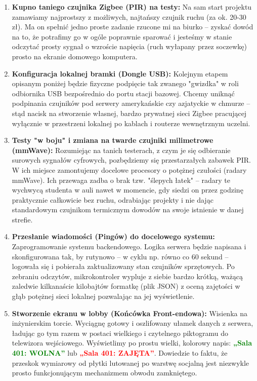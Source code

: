\documentclass[12pt,a4paper]{article}
\begin{document}
\begin{enumerate}
    \item \textbf{Kupno taniego czujnika Zigbee (PIR) na testy:} Na sam start projektu zamawiamy najprostszy z możliwych, najtańszy czujnik ruchu (za ok. 20-30 zł). Ma on spełnić jedno proste zadanie rzucone mi na biurko -- zyskać dowód na to, że potrafimy go w ogóle poprawnie sparować i jesteśmy w stanie odczytać prosty sygnał o wzroście napięcia (ruch wyłapany przez soczewkę) prosto na ekranie domowego komputera.
    
    \item \textbf{Konfiguracja lokalnej bramki (Dongle USB):} Kolejnym etapem opisanym poniżej będzie fizyczne podpięcie tak zwanego "gwizdka" w roli odbiornika USB bezpośrednio do portu stacji bazowej. Chcemy uniknąć podpinania czujników pod serwery amerykańskie czy azjatyckie w chmurze – stąd nacisk na stworzenie własnej, bardzo prywatnej sieci Zigbee pracującej wyłącznie w przestrzeni lokalnej po kablach i routerze wewnętrznym uczelni.
    
    \item \textbf{Testy "w boju" i zmiana na twarde czujniki milimetrowe (mmWave):} Rozumiejąc na tanich testerach, z czym je się odbieranie surowych sygnałów cyfrowych, pozbędziemy się przestarzałych zabawek PIR. W ich miejsce zamontujemy docelowe procesory o potężnej czułości (radary mmWave). Ich przewaga zadba o brak tzw. "ślepych łatek" -- radary te wychwycą studenta w auli nawet w momencie, gdy siedzi on przez godzinę praktycznie całkowicie bez ruchu, odrabiając projekty i nie dając standardowym czujnikom termicznym dowodów na swoje istnienie w danej strefie.
    
    \item \textbf{Przesłanie wiadomości (Pingów) do docelowego systemu:} Zaprogramowanie systemu backendowego. Logika serwera będzie napisana i skonfigurowana tak, by rutynowo -- w cyklu np. równo co 60 sekund -- logowała się i pobierała zaktualizowany stan czujników sprzętowych. Po zebraniu odczytów, mikrokontroler wypluje z siebie bardzo krótką, ważącą zaledwie kilkanaście kilobajtów formatkę (plik JSON) z oceną zajętości w głąb potężnej sieci lokalnej pozwalając na jej wyświetlenie.
    
    \item \textbf{Stworzenie ekranu w lobby (Końcówka Front-endowa):} Wisienka na inżynierskim torcie. Wyciągnę gotowy i oszlifowany ułamek danych z serwera, ładując go tym razem w postaci wielkiego i czytelnego piktogramu do telewizora wejściowego. Wyświetlimy po prostu wielki, kolorowy napis: \textcolor{green}{\textbf{„Sala 401: WOLNA”}} lub \textcolor{red}{\textbf{„Sala 401: ZAJĘTA”}}. Dowiedzie to faktu, że przeskok wymiarowy od płytki lutowanej po warstwę socjalną jest niezwykle prosto funkcjonującym mechanizmem obwodu zamkniętego.
\end{enumerate}
\end{document}
